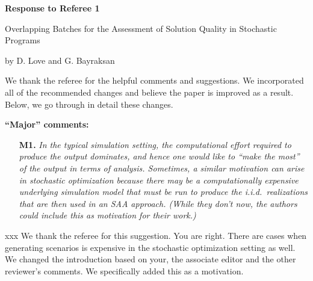 \documentclass[11pt,notitlepage,onecolumn]{article}
\newcommand{\noi}{\noindent}
\begin{document}

\singlespacing

\baselineskip0.26in


\pagebreak

\begin{center}
\textbf{\Large Response to Referee 1} 
\medskip

{\large Overlapping Batches for the Assessment of Solution Quality in Stochastic Programs}
\medskip

{\footnotesize by D. Love and G. Bayraksan}
\end{center}

\bigskip

\bigskip


We thank the referee for the helpful comments and suggestions. 
We incorporated all of the recommended changes and believe the paper is improved as a result. 
Below, we go through in detail these changes. 
\medskip

\bigskip 


\noi  
{\large \bf ``Major'' comments:}
\medskip 

\begin{itemize}
\item[\textbf{M1.}] \textit{In the typical simulation setting, the computational effort required to produce the output dominates, and hence one would like to ``make the most'' of the output in terms of analysis. 
Sometimes, a similar motivation can arise in stochastic optimization because there may be a computationally expensive underlying simulation model that must be run to produce the i.i.d.\ realizations that are then used in an SAA approach. 
(While they don't now, the authors could include this as motivation for
their work.)}
\end{itemize}

\noi xxx 
We thank the referee for this suggestion. 
You are right.
There are cases when generating scenarios is expensive in the stochastic optimization setting as well. 
We changed the introduction based on your, the associate editor and the other reviewer's comments. 
We specifically added this as a motivation. 
\medskip
\end{document}
